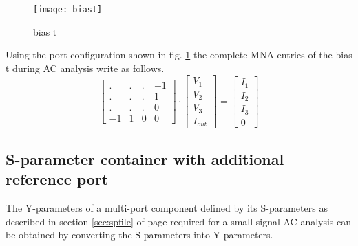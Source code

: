 \begin{figure}[ht]
\begin{center}
\texttt{[image: biast]}
\end{center}
\caption{bias t}
\label{fig:ACbiast}
\end{figure}
\FloatBarrier

Using the port configuration shown in fig. \ref{fig:ACbiast} the
complete MNA entries of the bias t during AC analysis write as
follows.
\begin{equation}
\begin{bmatrix}
 . & . & .  & -1\\
 . & . & .  &  1\\
 . & . & .  &  0\\
-1 & 1 & 0  &  0
\end{bmatrix}
\cdot
\begin{bmatrix}
V_{1}\\
V_{2}\\
V_{3}\\
I_{out}
\end{bmatrix}
=
\begin{bmatrix}
I_{1}\\
I_{2}\\
I_{3}\\
0
\end{bmatrix}
\end{equation}

\subsection{S-parameter container with additional reference port}

The Y-parameters of a multi-port component defined by its S-parameters
as described in section \ref{sec:spfile} of page \pageref{sec:spfile}
required for a small signal AC analysis can be obtained by converting
the S-parameters into Y-parameters.
